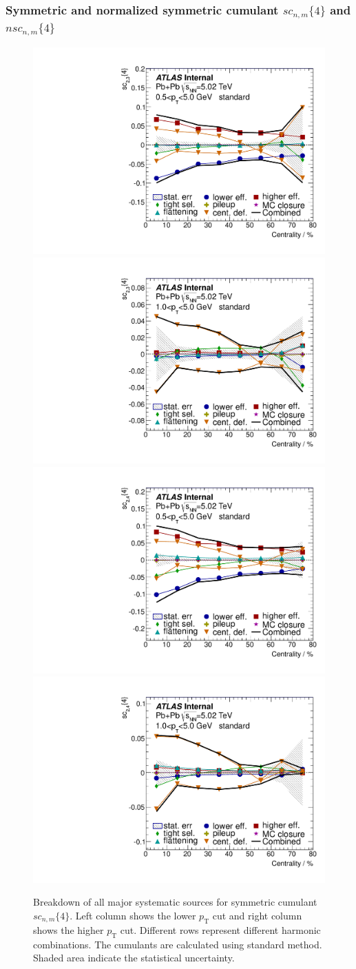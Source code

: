 \subsubsection{Symmetric and normalized symmetric cumulant $sc_{n,m}\{4\}$ and $nsc_{n,m}\{4\}$}
\begin{figure}[H]
\centering
\includegraphics[width=.425\linewidth]{figs/sec_sys/summary/sys_sc_1sub_Har2_Pt0.pdf}
\includegraphics[width=.425\linewidth]{figs/sec_sys/summary/sys_sc_1sub_Har2_Pt1.pdf}
\includegraphics[width=.425\linewidth]{figs/sec_sys/summary/sys_sc_1sub_Har3_Pt0.pdf}
\includegraphics[width=.425\linewidth]{figs/sec_sys/summary/sys_sc_1sub_Har3_Pt1.pdf}
\caption{Breakdown of all major systematic sources for symmetric cumulant $sc_{n,m}\{4\}$. Left column shows the lower $p_\text{T}$ cut and right column shows the higher $p_\text{T}$ cut. Different rows represent different harmonic combinations. The cumulants are calculated using standard method. Shaded area indicate the statistical uncertainty.}
\label{fig:sys_sum_sc}
\end{figure}


